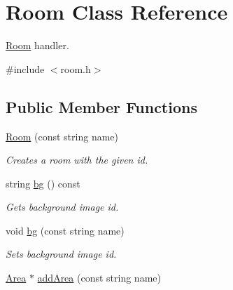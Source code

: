\hypertarget{classRoom}{
\section{Room Class Reference}
\label{classRoom}
}


\hyperlink{classRoom}{Room} handler.  




{\ttfamily \#include $<$room.h$>$}

\subsection*{Public Member Functions}
\begin{DoxyCompactItemize}
\item 
\hypertarget{classRoom_a9ff93651c42cc7f14c435e83409f851c}{
\hyperlink{classRoom_a9ff93651c42cc7f14c435e83409f851c}{Room} (const string name)}
\label{classRoom_a9ff93651c42cc7f14c435e83409f851c}

\begin{DoxyCompactList}\small\item\em Creates a room with the given id. \item\end{DoxyCompactList}\item 
\hypertarget{classRoom_a09eb3ce73b95cc80cd108516021d58e7}{
string \hyperlink{classRoom_a09eb3ce73b95cc80cd108516021d58e7}{bg} () const }
\label{classRoom_a09eb3ce73b95cc80cd108516021d58e7}

\begin{DoxyCompactList}\small\item\em Gets background image id. \item\end{DoxyCompactList}\item 
\hypertarget{classRoom_a393ab06d3558c14e01a2f40d1ddb60cc}{
void \hyperlink{classRoom_a393ab06d3558c14e01a2f40d1ddb60cc}{bg} (const string name)}
\label{classRoom_a393ab06d3558c14e01a2f40d1ddb60cc}

\begin{DoxyCompactList}\small\item\em Sets background image id. \item\end{DoxyCompactList}\item 
\hypertarget{classRoom_a70bc4cae1a9c6288a376f1866e5fa52a}{
\hyperlink{classArea}{Area} $\ast$ \hyperlink{classRoom_a70bc4cae1a9c6288a376f1866e5fa52a}{addArea} (const string name)}
\label{classRoom_a70bc4cae1a9c6288a376f1866e5fa52a}


\end{DoxyCompactItemize}
